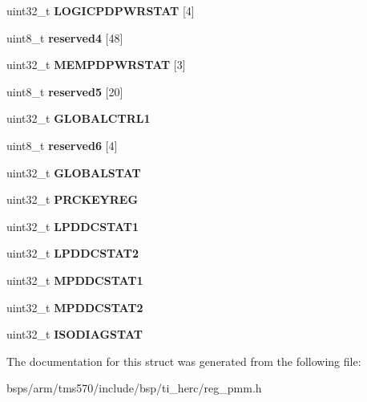 \begin{DoxyCompactItemize}
uint32\+\_\+t {\bfseries L\+O\+G\+I\+C\+P\+D\+P\+W\+R\+S\+T\+AT} \mbox{[}4\mbox{]}
\item 
\mbox{\label{structtms570__pmm__t_aba86207bded5e6af5f4f879368179f95}} 
uint8\+\_\+t {\bfseries reserved4} \mbox{[}48\mbox{]}
\item 
\mbox{\label{structtms570__pmm__t_a2fdc8971501111c67ea379c97d5d2e8b}} 
uint32\+\_\+t {\bfseries M\+E\+M\+P\+D\+P\+W\+R\+S\+T\+AT} \mbox{[}3\mbox{]}
\item 
\mbox{\label{structtms570__pmm__t_ac6bbf194867630a5d55f18aadce88d2c}} 
uint8\+\_\+t {\bfseries reserved5} \mbox{[}20\mbox{]}
\item 
\mbox{\label{structtms570__pmm__t_ab2cd70882ee718bd7e7b4a209f5f15f0}} 
uint32\+\_\+t {\bfseries G\+L\+O\+B\+A\+L\+C\+T\+R\+L1}
\item 
\mbox{\label{structtms570__pmm__t_a585f45250cef72c744866770191477c9}} 
uint8\+\_\+t {\bfseries reserved6} \mbox{[}4\mbox{]}
\item 
\mbox{\label{structtms570__pmm__t_af90d4fb93476e06b71612c56fca23eaa}} 
uint32\+\_\+t {\bfseries G\+L\+O\+B\+A\+L\+S\+T\+AT}
\item 
\mbox{\label{structtms570__pmm__t_ab62f9712445725d0313ce5aa27206288}} 
uint32\+\_\+t {\bfseries P\+R\+C\+K\+E\+Y\+R\+EG}
\item 
\mbox{\label{structtms570__pmm__t_aa523d4bded5bde9c494162a5dee6817a}} 
uint32\+\_\+t {\bfseries L\+P\+D\+D\+C\+S\+T\+A\+T1}
\item 
\mbox{\label{structtms570__pmm__t_a7bcea5bb52ab777a369061ef7a794ed0}} 
uint32\+\_\+t {\bfseries L\+P\+D\+D\+C\+S\+T\+A\+T2}
\item 
\mbox{\label{structtms570__pmm__t_af4a2f3e46be3556e10bbac75b9e355d3}} 
uint32\+\_\+t {\bfseries M\+P\+D\+D\+C\+S\+T\+A\+T1}
\item 
\mbox{\label{structtms570__pmm__t_a0ed0cb912da1846a10518200f0bb83aa}} 
uint32\+\_\+t {\bfseries M\+P\+D\+D\+C\+S\+T\+A\+T2}
\item 
\mbox{\label{structtms570__pmm__t_a1bfc9b0ea1c04985e5fb07eea97daa1f}} 
uint32\+\_\+t {\bfseries I\+S\+O\+D\+I\+A\+G\+S\+T\+AT}
\end{DoxyCompactItemize}


The documentation for this struct was generated from the following file\+:\begin{DoxyCompactItemize}
\item 
bsps/arm/tms570/include/bsp/ti\+\_\+herc/reg\+\_\+pmm.\+h\end{DoxyCompactItemize}
